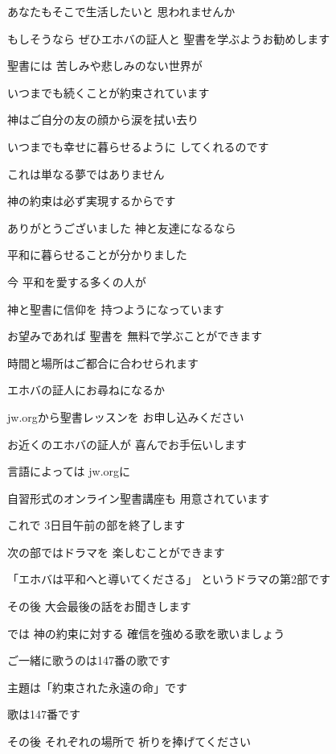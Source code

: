 \documentclass[twocolumn]{jsarticle}
\begin{document}
あなたもそこで生活したいと
思われませんか

もしそうなら ぜひエホバの証人と
聖書を学ぶようお勧めします

聖書には 苦しみや悲しみのない世界が

いつまでも続くことが約束されています

神はご自分の友の顔から涙を拭い去り

いつまでも幸せに暮らせるように
してくれるのです

これは単なる夢ではありません

神の約束は必ず実現するからです

ありがとうございました
神と友達になるなら

平和に暮らせることが分かりました

今 平和を愛する多くの人が

神と聖書に信仰を
持つようになっています

お望みであれば 聖書を
無料で学ぶことができます

時間と場所はご都合に合わせられます

エホバの証人にお尋ねになるか

jw.orgから聖書レッスンを
お申し込みください

お近くのエホバの証人が
喜んでお手伝いします

言語によっては jw.orgに

自習形式のオンライン聖書講座も
用意されています

これで 3日目午前の部を終了します

次の部ではドラマを
楽しむことができます

「エホバは平和へと導いてくださる」
というドラマの第2部です

その後 大会最後の話をお聞きします

では 神の約束に対する
確信を強める歌を歌いましょう

ご一緒に歌うのは147番の歌です

主題は「約束された永遠の命」です

歌は147番です

その後 それぞれの場所で
祈りを捧げてください
\end{document}
